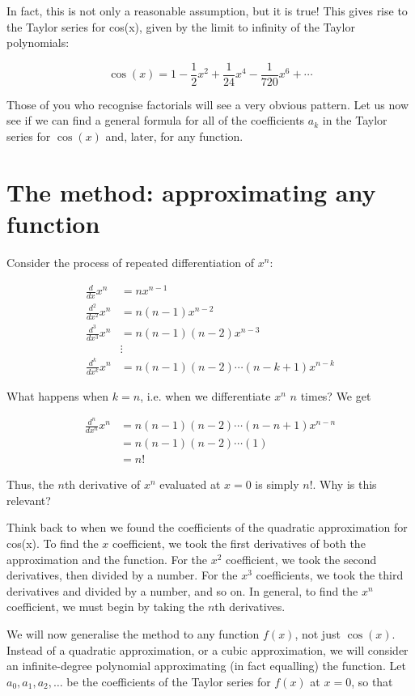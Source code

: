 \documentclass{article}
\begin{document}
In fact, this is not only a reasonable assumption, but it is true! This gives rise to the Taylor series for cos(x), given by the limit to infinity of the Taylor polynomials:

$$
\cos(x) = 1 - \frac{1}{2}x^2 + \frac{1}{24}x^4 - \frac{1}{720}x^6 + \cdots
$$

Those of you who recognise factorials will see a very obvious pattern. Let us now see if we can find a general formula for all of the coefficients $a_k$ in the Taylor series for $\cos(x)$ and, later, for any function.

\section*{The method: approximating any function}

Consider the process of repeated differentiation of $x^n$:

\begin{align*}
    \frac{d}{dx} x^n &= n x^{n-1} \\
    \frac{d^2}{dx^2} x^n &= n(n-1) x^{n-2} \\
    \frac{d^3}{dx^3} x^n &= n(n-1)(n-2) x^{n-3} \\
    &\vdots \\
    \frac{d^k}{dx^k} x^n &= n(n-1)(n-2)\cdots(n-k+1) x^{n-k}
\end{align*}

What happens when $k=n$, i.e. when we differentiate $x^n$ $n$ times? We get

\begin{align*}
    \frac{d^n}{dx^n} x^n &= n(n-1)(n-2)\cdots(n-n+1) x^{n-n} \\
    &= n(n-1)(n-2)\cdots(1) \\
    &= n!
\end{align*}

Thus, the $n$th derivative of $x^n$ evaluated at $x=0$ is simply $n!$. Why is this relevant?

Think back to when we found the coefficients of the quadratic approximation for cos(x). To find the $x$ coefficient, we took the first derivatives of both the approximation and the function. For the $x^2$ coefficient, we took the second derivatives, then divided by a number. For the $x^3$ coefficients, we took the third derivatives and divided by a number, and so on. In general, to find the $x^n$ coefficient, we must begin by taking the $n$th derivatives.

We will now generalise the method to any function $f(x)$, not just $\cos(x)$. Instead of a quadratic approximation, or a cubic approximation, we will consider an infinite-degree polynomial approximating (in fact equalling) the function. Let $a_0, a_1, a_2, \ldots$ be the coefficients of the Taylor series for $f(x)$ at $x=0$, so that
\end{document}
